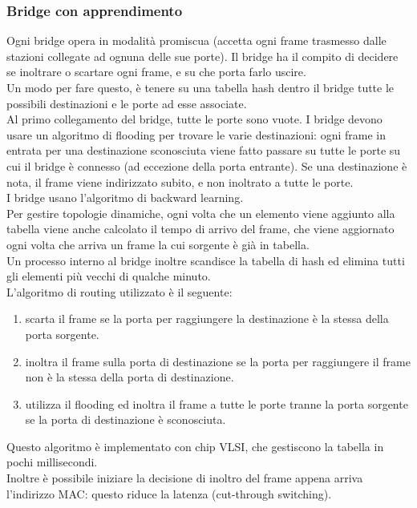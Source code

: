 \documentclass{article}
\begin{document}
\subsubsection{Bridge con apprendimento}
Ogni bridge opera in modalità promiscua (accetta ogni frame trasmesso dalle stazioni collegate ad ognuna delle sue porte). Il bridge ha il compito di decidere se inoltrare o scartare ogni frame, e su che porta farlo uscire.
\\ Un modo per fare questo, è tenere su una tabella hash dentro il bridge tutte le possibili destinazioni e le porte ad esse associate. \\
Al primo collegamento del bridge, tutte le porte sono vuote. I bridge devono usare un algoritmo di flooding per trovare le varie destinazioni: ogni frame in entrata per una destinazione sconosciuta viene fatto passare su tutte le porte
su cui il bridge è connesso (ad eccezione della porta entrante). Se una destinazione è nota, il frame viene indirizzato subito, e non inoltrato a tutte le porte.\\
I bridge usano l'algoritmo di backward learning. \\
Per gestire topologie dinamiche, ogni volta che un elemento viene aggiunto alla tabella viene anche calcolato il tempo di arrivo del frame, che viene aggiornato ogni volta che arriva un frame la cui sorgente è già in tabella.\\
Un processo interno al bridge inoltre scandisce la tabella di hash ed elimina tutti gli elementi più vecchi di qualche minuto. \\
L'algoritmo di routing utilizzato è il seguente:
\begin{enumerate}
\item scarta il frame se la porta per raggiungere la destinazione è la stessa della porta sorgente.
\item inoltra il frame sulla porta di destinazione se la porta per raggiungere il frame non è la stessa della porta di destinazione.
\item utilizza il flooding ed inoltra il frame a tutte le porte tranne la porta sorgente se la porta di destinazione è sconosciuta.
\end{enumerate}
Questo algoritmo è implementato con chip VLSI, che gestiscono la tabella in pochi millisecondi. \\
Inoltre è possibile iniziare la decisione di inoltro del frame appena arriva l'indirizzo MAC: questo riduce la latenza (cut-through switching).
\end{document}
